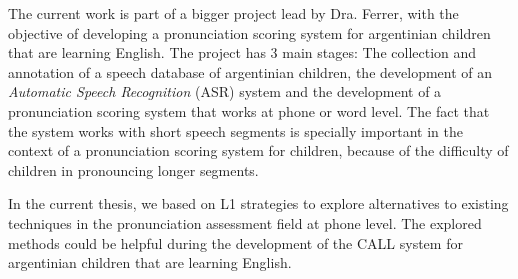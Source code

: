 

The current work is part of a bigger project lead by Dra. Ferrer, with the objective
of developing a pronunciation scoring system for argentinian
children that are learning English.
The project has 3 main stages: The collection and annotation of a speech database
of argentinian children, the development of an \textit{Automatic Speech Recognition} (ASR) system and the development of a pronunciation scoring system that works at phone or word
level. The fact that the system works with short speech segments is specially important in
the context of a pronunciation scoring system for
children, because of the difficulty of children in
pronouncing longer segments.

In the current thesis, we based on L1 strategies to
explore alternatives to existing techniques in the
pronunciation assessment field at phone level. The explored
methods could be helpful
during the development of the CALL system for argentinian children that are learning English.

